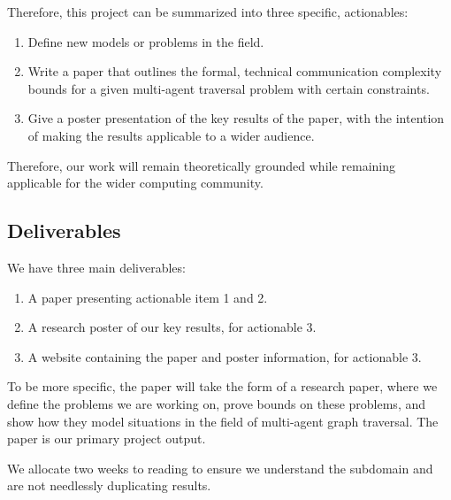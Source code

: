 Therefore, this project can be summarized into three specific, actionables:

\begin{enumerate}
    \item Define new models or problems in the field.
    \item Write a paper that outlines the formal, technical communication complexity bounds for a given multi-agent traversal problem with certain constraints.
    \item Give a poster presentation of the key results of the paper, with the intention of making the results applicable to a wider audience.
\end{enumerate}

Therefore, our work will remain theoretically grounded while remaining applicable for the wider computing community.

\subsection{Deliverables}

We have three main deliverables:

\begin{enumerate}
    \item A paper presenting actionable item 1 and 2.
    \item A research poster of our key results, for actionable 3.
    \item A website containing the paper and poster information, for actionable 3.
\end{enumerate}

To be more specific, the paper will take the form of a research paper, where we define the problems we are working on, prove bounds on these problems, and show how they model situations in the field of multi-agent graph traversal. The paper is our primary project output.


We allocate two weeks to reading to ensure we understand the subdomain and are not needlessly duplicating results.

